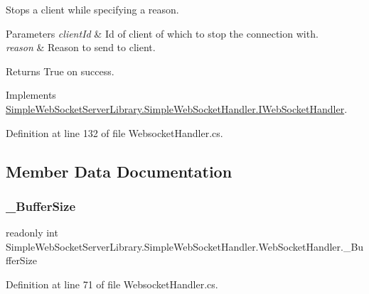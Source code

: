 Stops a client while specifying a reason. 


\begin{DoxyParams}{Parameters}
{\em client\+Id} & Id of client of which to stop the connection with.\\
\hline
{\em reason} & Reason to send to client.\\
\hline
\end{DoxyParams}
\begin{DoxyReturn}{Returns}
True on success.
\end{DoxyReturn}


Implements \mbox{\hyperlink{interface_simple_web_socket_server_library_1_1_simple_web_socket_handler_1_1_i_web_socket_handler_ae8b12d5764a614d7827c51cdb086bee0}{Simple\+Web\+Socket\+Server\+Library.\+Simple\+Web\+Socket\+Handler.\+I\+Web\+Socket\+Handler}}.



Definition at line 132 of file Websocket\+Handler.\+cs.



\subsection{Member Data Documentation}
\mbox{\label{class_simple_web_socket_server_library_1_1_simple_web_socket_handler_1_1_web_socket_handler_a82f255d10f7ada8915b0083a90aa488e}} 
\subsubsection{\texorpdfstring{\+\_\+\+Buffer\+Size}{\_BufferSize}}
{\footnotesize\ttfamily readonly int Simple\+Web\+Socket\+Server\+Library.\+Simple\+Web\+Socket\+Handler.\+Web\+Socket\+Handler.\+\_\+\+Buffer\+Size\hspace{0.3cm}{\ttfamily [private]}}



Definition at line 71 of file Websocket\+Handler.\+cs.

